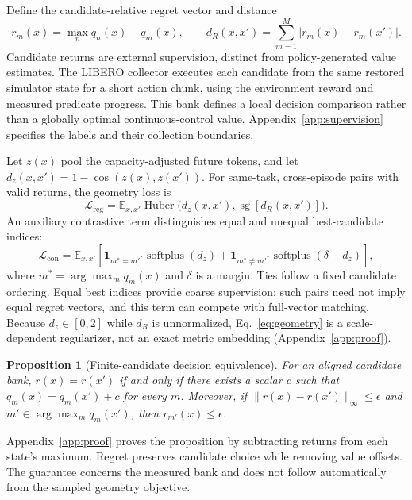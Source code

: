 \documentclass{article}
\newcommand{\sg}{\operatorname{sg}}
\newcommand{\Huber}{\operatorname{Huber}}
\newcommand{\softplus}{\operatorname{softplus}}
\newcommand{\E}{\mathbb{E}}
\newtheorem{proposition}{Proposition}
\begin{document}
Define the candidate-relative regret vector and distance
\begin{equation}
r_m(x)=\max_n q_n(x)-q_m(x),
\qquad
d_R(x,x')=\sum_{m=1}^{M}|r_m(x)-r_m(x')|.
\label{eq:regret}
\end{equation}
Candidate returns are external supervision, distinct from policy-generated value estimates. The LIBERO collector executes each candidate from the same restored simulator state for a short action chunk, using the environment reward and measured predicate progress. This bank defines a local decision comparison rather than a globally optimal continuous-control value. Appendix~\ref{app:supervision} specifies the labels and their collection boundaries.

Let $z(x)$ pool the capacity-adjusted future tokens, and let $d_z(x,x')=1-\cos(z(x),z(x'))$. For same-task, cross-episode pairs with valid returns, the geometry loss is
\begin{equation}
\mathcal L_{\mathrm{reg}}=\E_{x,x'}\Huber\big(d_z(x,x'),\sg[d_R(x,x')]\big).
\label{eq:geometry}
\end{equation}
An auxiliary contrastive term distinguishes equal and unequal best-candidate indices:
\begin{equation}
\mathcal L_{\mathrm{con}}=\E_{x,x'}\left[
\mathbf{1}_{m^*=m'^*}\softplus(d_z)
+\mathbf{1}_{m^*\ne m'^*}\softplus(\delta-d_z)
\right],
\label{eq:contrastive}
\end{equation}
where $m^*=\arg\max_m q_m(x)$ and $\delta$ is a margin. Ties follow a fixed candidate ordering. Equal best indices provide coarse supervision: such pairs need not imply equal regret vectors, and this term can compete with full-vector matching. Because $d_z\in[0,2]$ while $d_R$ is unnormalized, Eq.~\eqref{eq:geometry} is a scale-dependent regularizer, not an exact metric embedding (Appendix~\ref{app:proof}).

\begin{proposition}[Finite-candidate decision equivalence]
\label{prop:regret}
For an aligned candidate bank, $r(x)=r(x')$ if and only if there exists a scalar $c$ such that $q_m(x)=q_m(x')+c$ for every $m$. Moreover, if $\|r(x)-r(x')\|_\infty\leq\epsilon$ and $m'\in\arg\max_m q_m(x')$, then $r_{m'}(x)\leq\epsilon$.
\end{proposition}
Appendix~\ref{app:proof} proves the proposition by subtracting returns from each state's maximum. Regret preserves candidate choice while removing value offsets. The guarantee concerns the measured bank and does not follow automatically from the sampled geometry objective.
\end{document}
